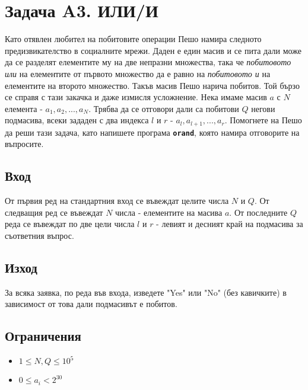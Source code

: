 \documentclass[12pt]{article}
\begin{document}
\section*{Задача A3. ИЛИ/И}

Като отявлен любител на побитовите операции Пешо намира следното предизвикателство в социалните мрежи. Даден е един масив и се пита дали може да се разделят елементите му на две непразни множества, така че \textit{побитовото или} на елементите от първото множество да е равно на \textit{побитовото и} на елементите на второто множество. Такъв масив Пешо нарича побитов. Той бързо се справя с тази закачка и даже измисля усложнение. Нека имаме масив $a$ с $N$ елемента - $a_1, a_2, ..., a_N$. Трябва да се отговори дали са побитови $Q$ негови подмасива, всеки зададен с два индекса $l$ и $r$ - $a_l, a_{l+1}, ..., a_r$. Помогнете на Пешо да реши тази задача, като напишете програма \textbf{\texttt{orand}}, която намира отговорите на въпросите.

\subsection*{Вход}

От първия ред на стандартния вход се въвеждат целите числа $N$ и $Q$. От следващия ред се въвеждат $N$ числа - елементите на масива $a$. От последните $Q$ реда се въвеждат по две цели числа $l$ и $r$ - левият и десният край на подмасива за съответния въпрос.

\subsection*{Изход}
За всяка заявка, по реда във входа, изведете "Yes" или "No" (без кавичките) в зависимост от това дали подмасивът е побитов.

\subsection*{Ограничения}
\begin{itemize}
	\item $1\leq N, Q\leq 10^5$
	\item $0\leq a_i < 2^{30}$
	\vspace*{-0.1cm}
\end{itemize}
\end{document}
